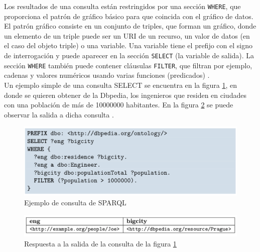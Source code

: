 Los resultados de una consulta están restringidos por una sección \texttt{WHERE}, que proporciona el patrón de gráfico básico para que coincida con el gráfico de datos. El patrón gráfico consiste en un conjunto de triples, que forman un gráfico, donde un elemento de un triple puede ser un URI de un recurso, un valor de datos (en el caso del objeto triple) o una variable. Una variable tiene el prefijo con el signo de interrogación y puede aparecer en la sección \texttt{SELECT} (la variable de salida). La sección \texttt{WHERE} también puede contener cláusulas \texttt{FILTER}, que filtran por ejemplo, cadenas y valores numéricos usando varias funciones (predicados) \cite{tesis-otro}.\\

Un ejemplo simple de una consulta SELECT se encuentra en la figura \ref{fig:ejemplo-sparql}, en donde se quieren obtener de la Dbpedia, los ingenieros que residen en ciudades con una población de más de 10000000 habitantes. En la figura \ref{fig:salida-sparql} se puede observar la salida a dicha consulta \cite{tesis-otro}.

\begin{figure}[H]
	\centering
	\includegraphics[width=0.9\linewidth]{imagenes/capitulo3/consulta}
	\caption{Ejemplo de consulta de SPARQL \cite{tesis-otro}}
	\label{fig:ejemplo-sparql}
\end{figure}

\begin{figure}[H]
	\centering
	\includegraphics[width=0.9\linewidth]{imagenes/capitulo3/salida-sparql}
	\caption{Respuesta a la salida de la consulta de la figura \ref{fig:ejemplo-sparql}}
	\label{fig:salida-sparql}
\end{figure}



